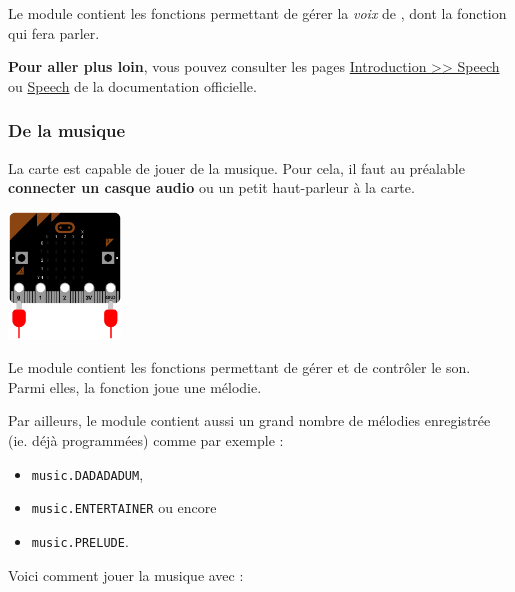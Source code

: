 Le module  contient les fonctions permettant de gérer la \emph{voix} de \mb, dont la fonction  qui fera parler.

\begin{methode}
\end{methode}

\begin{remarque}
\textbf{Pour aller plus loin}, vous pouvez consulter les pages  \href{https://microbit-micropython.readthedocs.io/fr/latest/tutorials/speech.html}{Introduction >> Speech} ou \href{https://microbit-micropython.readthedocs.io/fr/latest/speech.html}{Speech} de la documentation officielle.
\end{remarque}


\subsubsection{De la musique}

La carte \mb est capable de jouer de la musique. Pour cela, il faut au préalable \textbf{connecter un casque audio} ou un petit haut-parleur à la carte.

\begin{center}
\includegraphics[width=3cm]{res/mbpy-init-audio.png}    
\end{center}

Le module  contient les fonctions permettant de gérer et de contrôler le son. Parmi elles, la fonction  joue une mélodie.

Par ailleurs, le module   contient aussi un grand nombre de mélodies enregistrée (ie. déjà programmées) comme par exemple :
\begin{itemize}
    \item \texttt{music.DADADADUM},
    \item \texttt{music.ENTERTAINER} ou encore
    \item \texttt{music.PRELUDE}.
\end{itemize}


\begin{methode}
Voici comment jouer la musique  avec \mb :

\end{methode}

